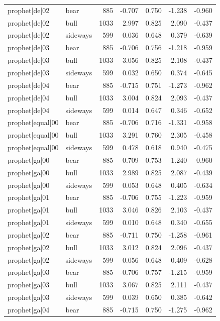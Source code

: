 \begin{table}
\begin{tabular}{llrrrrr}
prophet|de|02 & bear & 885 & -0.707 & 0.750 & -1.238 & -0.960 \\
prophet|de|02 & bull & 1033 & 2.997 & 0.825 & 2.090 & -0.437 \\
prophet|de|02 & sideways & 599 & 0.036 & 0.648 & 0.379 & -0.639 \\
prophet|de|03 & bear & 885 & -0.706 & 0.756 & -1.218 & -0.959 \\
prophet|de|03 & bull & 1033 & 3.056 & 0.825 & 2.108 & -0.437 \\
prophet|de|03 & sideways & 599 & 0.032 & 0.650 & 0.374 & -0.645 \\
prophet|de|04 & bear & 885 & -0.715 & 0.751 & -1.273 & -0.962 \\
prophet|de|04 & bull & 1033 & 3.004 & 0.824 & 2.093 & -0.437 \\
prophet|de|04 & sideways & 599 & 0.014 & 0.647 & 0.346 & -0.652 \\
prophet|equal|00 & bear & 885 & -0.706 & 0.716 & -1.331 & -0.958 \\
prophet|equal|00 & bull & 1033 & 3.291 & 0.760 & 2.305 & -0.458 \\
prophet|equal|00 & sideways & 599 & 0.478 & 0.618 & 0.940 & -0.475 \\
prophet|ga|00 & bear & 885 & -0.709 & 0.753 & -1.240 & -0.960 \\
prophet|ga|00 & bull & 1033 & 2.989 & 0.825 & 2.087 & -0.439 \\
prophet|ga|00 & sideways & 599 & 0.053 & 0.648 & 0.405 & -0.634 \\
prophet|ga|01 & bear & 885 & -0.706 & 0.755 & -1.223 & -0.959 \\
prophet|ga|01 & bull & 1033 & 3.046 & 0.826 & 2.103 & -0.437 \\
prophet|ga|01 & sideways & 599 & 0.010 & 0.648 & 0.340 & -0.655 \\
prophet|ga|02 & bear & 885 & -0.711 & 0.750 & -1.258 & -0.961 \\
prophet|ga|02 & bull & 1033 & 3.012 & 0.824 & 2.096 & -0.437 \\
prophet|ga|02 & sideways & 599 & 0.056 & 0.648 & 0.409 & -0.628 \\
prophet|ga|03 & bear & 885 & -0.706 & 0.757 & -1.215 & -0.959 \\
prophet|ga|03 & bull & 1033 & 3.067 & 0.825 & 2.111 & -0.437 \\
prophet|ga|03 & sideways & 599 & 0.039 & 0.650 & 0.385 & -0.642 \\
prophet|ga|04 & bear & 885 & -0.715 & 0.750 & -1.275 & -0.962 \\

\end{tabular}
\end{table}
